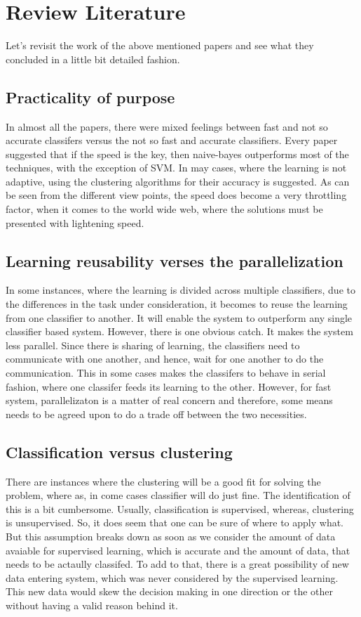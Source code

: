 \documentclass[12pt]{book}
\begin{document}
\section{Review Literature}
Let's revisit the work of the above mentioned papers and see what they concluded in a little bit detailed fashion.
\subsection{Practicality of purpose}
In almost all the papers, there were mixed feelings between fast and not so accurate classifers versus the not so fast and accurate classifiers. Every paper suggested that if the speed is the key, then naive-bayes outperforms most of the techniques, 
with the exception of SVM. In may cases, where the learning is not adaptive, using the clustering algorithms for their accuracy is suggested. As can be seen from the different view points, the speed does become a very throttling factor, when it comes 
to the world wide web, where the solutions must be presented with lightening speed.

\subsection{Learning reusability verses the parallelization}
In some instances, where the learning is divided across multiple classifiers, due to the differences in the task under consideration, it becomes to reuse the learning from one classifier to another. It will enable the system to outperform any single classifier based system.
However, there is one obvious catch. It makes the system less parallel. Since there is sharing of learning, the classifiers need to communicate with one another, and hence, wait for one another to do the communication. This in some cases makes the classifers to behave in 
serial fashion, where one classifer feeds its learning to the other. However, for fast system, parallelizaton is a matter of real concern and therefore, some means needs to be agreed upon to do a trade off between the two necessities.

\subsection{Classification versus clustering}
There are instances where the clustering will be a good fit for solving the problem, where as, in come cases classifier will do just fine. The identification of this is a bit cumbersome. Usually, classification is supervised, whereas, clustering is unsupervised. So, it does seem
that one can be sure of where to apply what. But this assumption breaks down as soon as we consider the amount of data avaiable for supervised learning, which is accurate and the amount of data, that needs to be actaully classifed. To add to that, there is a great possibility of 
new data entering system, which was never considered by the supervised learning. This new data would skew the decision making in one direction or the other without having a valid reason behind it.
\end{document}
